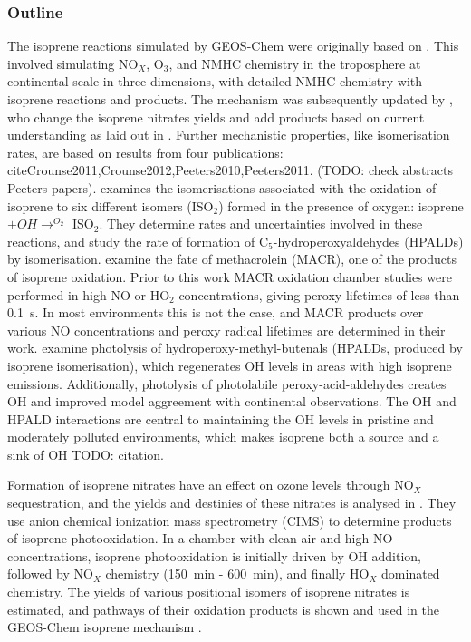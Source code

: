     \subsubsection{Outline}
      The isoprene reactions simulated by GEOS-Chem were originally based on \textcite{Horowitz1998}.
      This involved simulating NO$_X$, O$_3$, and NMHC chemistry in the troposphere at continental scale in three dimensions, with detailed NMHC chemistry with isoprene reactions and products.
      The mechanism was subsequently updated by \citet{Mao2013}, who change the isoprene nitrates yields and add products based on current understanding as laid out in \citet{Paulot2009a,Paulot2009b}.
      Further mechanistic properties, like isomerisation rates, are based on results from four publications: cite{Crounse2011,Crounse2012,Peeters2010,Peeters2011}.
      (TODO: check abstracts Peeters papers).
      \textcite{Crounse2011} examines the isomerisations associated with the oxidation of isoprene to six different isomers (ISO$_2$) formed in the presence of oxygen: isoprene $ + OH \rightarrow^{O_2} $ ISO$_2$.
      They determine rates and uncertainties involved in these reactions, and study the rate of formation of C$_5$-hydroperoxyaldehydes (HPALDs) by isomerisation.
      \textcite{Crounse2012} examine the fate of methacrolein (MACR), one of the products of isoprene oxidation. 
      Prior to this work MACR oxidation chamber studies were performed in high NO or HO$_2$ concentrations, giving peroxy lifetimes of less than 0.1~s.
      In most environments this is not the case, and MACR products over various NO concentrations and peroxy radical lifetimes are determined in their work.
      \textcite{Peeters2010} examine photolysis of hydroperoxy-methyl-butenals (HPALDs, produced by isoprene isomerisation), which regenerates OH levels in areas with high isoprene emissions.
      Additionally, photolysis of photolabile peroxy-acid-aldehydes creates OH and improved model aggreement with continental observations.
      The OH and HPALD interactions are central to maintaining the OH levels in pristine and moderately polluted environments, which makes isoprene both a source and a sink of OH TODO: citation.
      
      Formation of isoprene nitrates have an effect on ozone levels through NO$_X$ sequestration, and the yields and destinies of these nitrates is analysed in \citet{Paulot2009a}. 
      They use anion chemical ionization mass spectrometry (CIMS) to determine products of isoprene photooxidation.
      In a chamber with clean air and high NO concentrations, isoprene photooxidation is initially driven by OH addition, followed by NO$_X$ chemistry (150~min - 600~min), and finally HO$_X$ dominated chemistry.
      The yields of various positional isomers of isoprene nitrates is estimated, and pathways of their oxidation products is shown and used in the GEOS-Chem isoprene mechanism \parencite{Paulot2009a,Mao2013}. 
      
